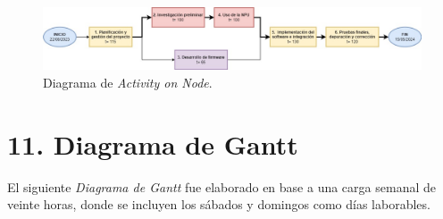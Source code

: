 \documentclass[
11pt, %
]{charter}
\begin{document}
\begin{figure}[htpb]
\centering 
\includegraphics[width=1.1\textwidth]{./Figuras/Activity on node.jpg}
\caption{Diagrama de \textit{Activity on Node}.}
\label{fig:AoN}
\end{figure}



\section{11. Diagrama de Gantt}
\label{sec:gantt}

El siguiente \textit{Diagrama de Gantt} fue elaborado en base a una carga semanal de veinte horas, donde se incluyen los sábados y domingos como días laborables.
\end{document}
